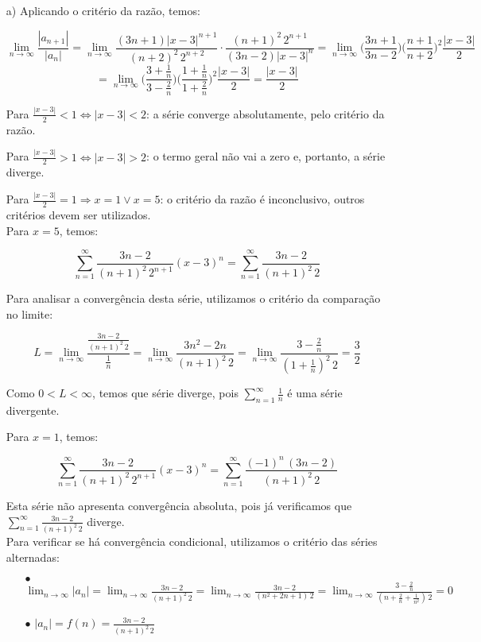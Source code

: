 \documentclass[12pt,a4paper]{article}
\begin{document}
\begin{itemize}
\item[a)] Aplicando o critério da razão, temos:

$$\lim_{n\rightarrow\infty} \frac{|a_{n+1}|}{|a_n|} = \lim_{n\rightarrow\infty} \frac{(3n+1) |x-3|^{n+1}}{(n+2)^2 \, 2^{n+2}}  \cdot \frac{(n+1)^2 \, 2^{n+1}}{(3n-2) |x-3|^n} = \lim_{n\rightarrow\infty} \Big( \frac{3n+1}{3n-2} \Big) \Big( \frac{n+1}{n+2} \Big)^2 \frac{|x-3|}{2}  $$
$$ = \lim_{n\rightarrow\infty} \Bigg( \frac{3+\frac{1}{n}}{3-\frac{2}{n}} \Bigg) \Bigg( \frac{1+\frac{1}{n}}{1+\frac{2}{n}} \Bigg)^2 \frac{|x-3|}{2} = \frac{|x-3|}{2} $$

Para $\frac{|x-3|}{2} < 1 \Leftrightarrow |x-3| < 2$: a série converge absolutamente, pelo critério da razão.

Para $\frac{|x-3|}{2} > 1 \Leftrightarrow |x-3| > 2$: o termo geral não vai a zero e, portanto, a série diverge.

Para $\frac{|x-3|}{2} = 1 \Rightarrow x = 1 \lor x=5$: o critério da razão é inconclusivo, outros critérios devem ser utilizados. \\

Para $x=5$, temos:

$$  \sum_{n=1}^\infty \frac{3n-2}{(n+1)^2 \, 2^{n+1}} (x-3)^n = \sum_{n=1}^\infty \frac{3n-2}{(n+1)^2 \, 2} $$

Para analisar a convergência desta série, utilizamos o critério da comparação no limite:

$$ L = \lim_{n\rightarrow\infty} \frac{\frac{3n-2}{(n+1)^2 \, 2}}{\frac{1}{n}} = \lim_{n\rightarrow\infty} \frac{3n^2-2n}{(n+1)^2 \, 2} = \lim_{n\rightarrow\infty} \frac{3-\frac{2}{n}}{(1+\frac{1}{n})^2 \, 2} = \frac{3}{2}  $$

Como $0 < L < \infty$, temos que série diverge, pois $\displaystyle\sum_{n=1}^\infty \frac{1}{n}$ é uma série divergente.

Para $x=1$, temos:

$$  \sum_{n=1}^\infty \frac{3n-2}{(n+1)^2 \, 2^{n+1}} (x-3)^n = \sum_{n=1}^\infty \frac{(-1)^n \, (3n-2)}{(n+1)^2 \, 2} $$

Esta série não apresenta convergência absoluta, pois já verificamos que $\displaystyle\sum_{n=1}^\infty \frac{3n-2}{(n+1)^2 \, 2}$ diverge. \\

Para verificar se há convergência condicional, utilizamos o critério das séries alternadas: 
    
    \begin{itemize}
    \item[$\bullet$] $\displaystyle\lim_{n \rightarrow \infty} |a_n| = \lim_{n \rightarrow \infty} \frac{3n-2}{(n+1)^2 \, 2} = \lim_{n \rightarrow \infty} \frac{3n-2}{(n^2 + 2n + 1) \, 2} = \lim_{n \rightarrow \infty} \frac{3-\frac{2}{n}}{(n + \frac{2}{n} + \frac{1}{n^2}) \, 2} = 0 $
    \item[$\bullet$] $|a_{n}| = f(n) = \displaystyle\frac{3n-2}{(n+1)^2 \, 2}  $
    

\end{itemize}
\end{itemize}
\end{document}
